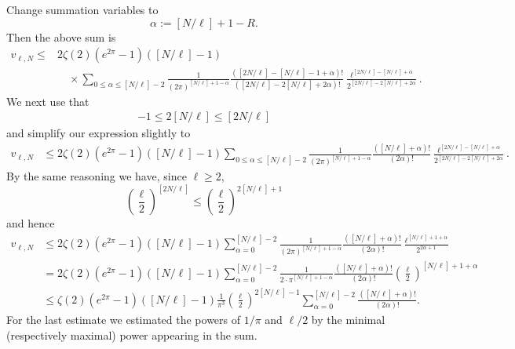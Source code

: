 \documentclass[12pt]{amsart}
\theoremstyle{definition}
\numberwithin{equation}{section}
\theoremstyle{definition} %
\theoremstyle{remark}
\begin{document}
Change summation variables to 
\[
\alpha := [N/\ell]+1 - R. 
\]
Then the above sum is
\begin{align*}
  v_{\ell,N}\leq &2\zeta(2) (e^{2\pi}-1)([N/\ell]-1) \\
  &\quad \times
  \sum_{0\leq \alpha\leq [N/\ell] - 2}  
  \frac{1}{(2\pi)^{[N/\ell]+1 -\alpha}}
  \frac{([2N/\ell]-[N/\ell]-1 +\alpha )!}
  {([2N/\ell]-2[N/\ell]+2\alpha)!} 
  \frac{\ell^{[2N/\ell]-[N/\ell] +\alpha}}{2^{[2N/\ell]-2[N/\ell]+2\alpha}}.
\end{align*}
We next use that 
\begin{align*}
    [2N/\ell]-1\leq 2[N/\ell]\leq [2N/\ell]
\end{align*}
and simplify our expression slightly to
  \begin{align*}
  v_{\ell,N}&\leq 
  2\zeta(2) (e^{2\pi}-1)([N/\ell]-1)
  \sum_{0\leq \alpha\leq [N/\ell] - 2}  
  \frac{1}{(2\pi)^{[N/\ell]+1 -\alpha}}
  \frac{([N/\ell] +\alpha )!}
  {(2\alpha)!} 
  \frac{\ell^{[2N/\ell]-[N/\ell] +\alpha}}{2^{[2N/\ell]-2[N/\ell]+2\alpha}}.
  \end{align*}
By the same reasoning we have, since $\ell\geq 2$,
\[
\left(\frac\ell 2\right)^{[2N/\ell]}\leq \left(\frac\ell 2\right)^{2[N/\ell]+1}
\]
and hence 
  \begin{align*}
    v_{\ell,N}&\leq 
  2\zeta(2) (e^{2\pi}-1)([N/\ell]-1)
  \sum_{\alpha=0}^{[N/\ell] - 2} 
  \frac{1}{(2\pi)^{[N/\ell]+1 -\alpha}}
  \frac{([N/\ell] +\alpha )!}
  {(2\alpha)!} 
  \frac{\ell^{[N/\ell]+1 +\alpha}}{2^{2\alpha+1}}
 \\&=
  2\zeta(2) (e^{2\pi}-1)([N/\ell]-1)
  \sum_{\alpha=0}^{[N/\ell] - 2} 
  \frac{1}{ 2\cdot \pi^{[N/\ell]+1 -\alpha}}
  \frac{([N/\ell] +\alpha )!}
  {(2\alpha)!} 
  \left(\frac{\ell}{2}\right)^{[N/\ell]+1 +\alpha}
  \\&\leq
  \zeta(2) (e^{2\pi}-1)([N/\ell]-1)
  \frac{1}{\pi^3}
  \left(\frac{\ell}{2}\right)^{2[N/\ell]-1}
  \sum_{\alpha=0}^{[N/\ell] - 2} 
  \frac{([N/\ell] +\alpha )!}
  {(2\alpha)!} 
  .
\end{align*}
For the last estimate we estimated the powers of $1/\pi$ and $\ell/2$ by the minimal (respectively maximal) power appearing in the sum.
\end{document}
